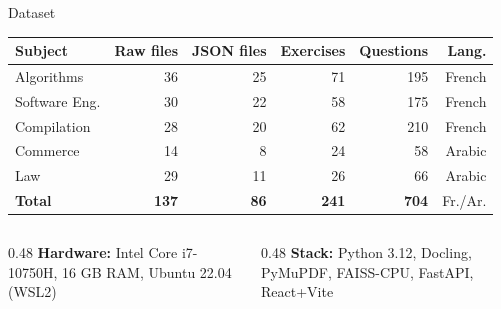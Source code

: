 \documentclass[aspectratio=169]{beamer}
\begin{document}
\begin{frame}{Dataset}
  \centering
  \begin{tabular}{lrrrrr}
    \toprule
    \textbf{Subject} & \textbf{Raw files} & \textbf{JSON files}
      & \textbf{Exercises} & \textbf{Questions} & \textbf{Lang.} \\
    \midrule
    Algorithms     & 36  & 25  & 71  & 195 & French \\
    Software Eng.  & 30  & 22  & 58  & 175 & French \\
    Compilation    & 28  & 20  & 62  & 210 & French \\
    Commerce       & 14  &  8  & 24  &  58 & Arabic \\
    Law            & 29  & 11  & 26  &  66 & Arabic \\
    \midrule
    \textbf{Total} & \textbf{137} & \textbf{86} & \textbf{241} & \textbf{704} & Fr./Ar. \\
    \bottomrule
  \end{tabular}

  \vspace{8pt}
  \begin{columns}[T]
    \begin{column}{0.48\textwidth}
      \textbf{Hardware:} Intel Core i7-10750H, 16 GB RAM, Ubuntu 22.04 (WSL2)
    \end{column}
    \begin{column}{0.48\textwidth}
      \textbf{Stack:} Python 3.12, Docling, PyMuPDF, FAISS-CPU, FastAPI, React+Vite
    \end{column}
  \end{columns}
\end{frame}
\end{document}
